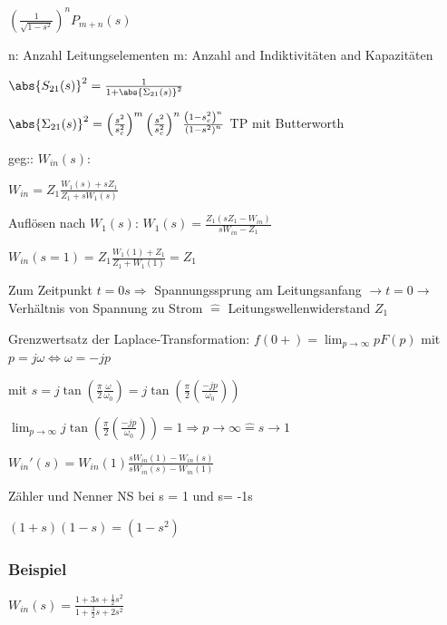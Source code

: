 $\left(\frac{1}{\sqrt{1 -s^2}}\right)^n P_{m+n}(s)$

n: Anzahl Leitungselementen
m: Anzahl and Indiktivitäten and Kapazitäten



$\abs{S_{21}(s)}^2 = \frac{1}{1 + \abs{\Sigma_{21}(s)}^2}$

$\abs{\Sigma_{21}(s)}^2 = \left(\frac{s^2}{s_c^2}\right)^m \left(\frac{s^2}{s_c^2}\right)^n \frac{\left(1 - s_c^2\right)^n}{\left(1 - s^2\right)^n}$ TP mit Butterworth


geg:: $W_{in}(s)$:


$W_{in} = Z_1 \frac{W_1(s) + sZ_1}{Z_1 + sW_1(s)}$

Auflösen nach $W_1(s)$: 
$W_1(s) = \frac{Z_1 (sZ_1 - W_{in})}{sW_{in} - Z_1}$

$W_{in}(s=1) = Z_1 \frac{W_1(1) + Z_1}{Z_1 + W_1(1)} = Z_1$


Zum Zeitpunkt $t=0s \Rightarrow$ Spannungssprung am Leitungsanfang $\rightarrow t = 0 \rightarrow$ Verhältnis von Spannung zu Strom $\hat{=}$ Leitungswellenwiderstand $Z_1$


Grenzwertsatz der Laplace-Transformation: $f(0+) = \lim_{p\rightarrow\infty} \limits p F(p)$ mit $p = j\omega \Leftrightarrow \omega = -jp$

mit $s = j \tan(\frac{\pi}{2} \frac{\omega}{\omega_0}) = j \tan(\frac{\pi}{2} \left(\frac{-jp}{\omega_0}\right))$

$\lim_{p\rightarrow\infty} \limits j \tan(\frac{\pi}{2} \left(\frac{-jp}{\omega_0}\right)) = 1 \Rightarrow p \rightarrow \infty \hat{=} s \rightarrow 1$

$W_{in}'(s) = W_{in}(1) \frac{sW_{in}(1) - W_{in}(s)}{sW_{in}(s) - W_{in}(1)}$

Zähler und Nenner NS bei s = 1 und s= -1s

$(1+s)(1-s) = (1-s^2)$


\subsubsection{Beispiel}

$W_{in}(s) = \frac{1 + 3s + \frac{1}{2}s^2}{1 + \frac{3}{2}s + 2 s^2}$

